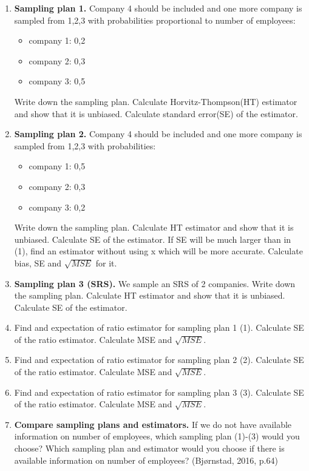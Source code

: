 \documentclass[12pt]{article}
\begin{document}
\begin{enumerate}
\item \textbf{Sampling plan 1.} Company 4 should be included and one more company is sampled from 1,2,3 with probabilities proportional to number of employees:
\begin{itemize}
\item company 1: 0,2
\item company 2: 0,3
\item company 3: 0,5
\end{itemize}
Write down the sampling plan. Calculate Horvitz-Thompson(HT) estimator and show that it is unbiased. Calculate standard error(SE) of the estimator.
\item \textbf{Sampling plan 2.} Company 4 should be included and one more company is sampled from 1,2,3 with probabilities:
\begin{itemize}
\item company 1: 0,5
\item company 2: 0,3
\item company 3: 0,2
\end{itemize}
Write down the sampling plan. Calculate HT estimator and show that it is unbiased. Calculate SE of the estimator. If SE will be much larger than in (1), find an estimator without using x which will be more accurate. Calculate bias, SE and $\sqrt{MSE}$ for it.
\item \textbf{Sampling plan 3 (SRS).} We sample an SRS of 2 companies. Write down the sampling plan. Calculate HT estimator and show that it is unbiased. Calculate SE of the estimator. 
\item Find and expectation of ratio estimator for sampling plan 1 (1). Calculate SE of the ratio estimator. Calculate MSE and $\sqrt{MSE}$.
\item Find and expectation of ratio estimator for sampling plan 2 (2). Calculate SE of the ratio estimator. Calculate MSE and $\sqrt{MSE}$.
\item Find and expectation of ratio estimator for sampling plan 3 (3). Calculate SE of the ratio estimator. Calculate MSE and $\sqrt{MSE}$.
\item \textbf{Compare sampling plans and estimators.} If we do not have available information on number of employees, which sampling plan (1)-(3) would you choose? Which sampling plan and estimator would you choose if there is available information on number of employees?  \hfill(Bjørnstad, 2016, p.64)
\end{enumerate}
\end{document}
